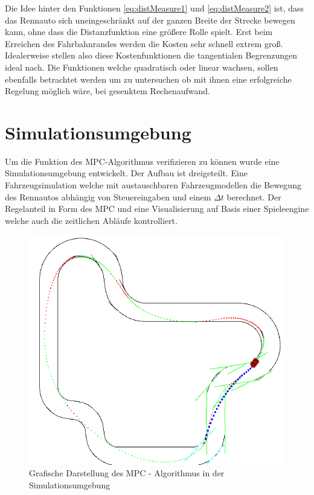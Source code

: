 \documentclass{like}
\begin{document}
Die Idee hinter den Funktionen \ref{eq:distMeasure1} und \ref{eq:distMeasure2} ist, dass das Rennauto sich uneingeschränkt auf der ganzen Breite der Strecke bewegen kann, ohne dass die Distanzfunktion eine größere Rolle spielt. Erst beim Erreichen des Fahrbahnrandes werden die Kosten sehr schnell extrem groß. Idealerweise stellen also diese Kostenfunktionen die tangentialen Begrenzungen ideal nach. Die Funktionen welche quadratisch oder linear wachsen, sollen ebenfalls betrachtet werden um zu untersuchen ob mit ihnen eine erfolgreiche Regelung möglich wäre, bei gesenktem Rechenaufwand. 



\chapter{Simulationsumgebung}
Um die Funktion des \ac{MPC}-Algorithmus verifizieren zu können wurde eine Simulationsumgebung entwickelt. Der Aufbau ist dreigeteilt. Eine Fahrzeugsimulation welche mit austauschbaren Fahrzeugmodellen die Bewegung des Rennautos abhängig von Steuereingaben und einem $\Delta t$ berechnet. Der Regelanteil in Form des \ac{MPC} und eine Visualisierung auf Basis einer Spieleengine welche auch die zeitlichen Abläufe kontrolliert. 


\begin{figure}[ht!]
	\centering
	\includegraphics[width=350pt]{Abbildungen/sim_visual.png}
	\caption{Grafische Darstellung des MPC - Algorithmus in der Simulationsumgebung}
	\label{fig:jumpDiagram}
\end{figure}
\end{document}
